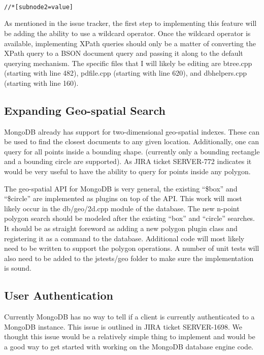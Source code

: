 \documentclass{dependencies/acm_proc_article-sp}
\begin{document}
\begin{center}
\begin{lstlisting}

//*[subnode2=value]
\end{lstlisting}
\end{center}
As mentioned in the issue tracker, the first step to implementing this feature will be adding the ability to use a wildcard operator. Once the wildcard operator is available, implementing XPath queries should only be a matter of converting the XPath query to a BSON document query and passing it along to the default querying mechanism. The specific files that I will likely be editing are btree.cpp (starting with line 482), pdfile.cpp (starting with line 620), and dbhelpers.cpp (starting with line 160).

\subsection{Expanding Geo-spatial Search}
MongoDB already has support for two-dimensional geo-spatial indexes.
These can be used to find the closest documents to any given location.
Additionally, one can query for all points inside a bounding shape. (currently
only a bounding rectangle and a bounding circle are supported). As JIRA ticket
SERVER-772\cite{18} indicates it would be very useful to have the ability to
query for points inside any polygon.

The geo-spatial API for MongoDB is very general, the existing ``\$box'' and ``\$circle''
are implemented as plugins on top of the API.
This work will most likely occur in the db/geo/2d.cpp module of the database. The new n-point polygon
search should be modeled after the existing ``box'' and ``circle'' searches. It should be as straight foreword
as adding a new polygon plugin class and registering it as a command to the database. Additional code will most
likely need to be written to support the polygon operations.
A number of unit tests will also need to be added to the jstests/geo folder to make sure the implementation is sound.

\subsection{User Authentication}
Currently MongoDB has no way to tell if a client is currently authenticated
to a MongoDB instance. This issue is outlined in JIRA ticket SERVER-1698\cite{19}.
We thought this issue would be a relatively simple thing to implement and would be
a good way to get started with working on the MongoDB database engine code.
\end{document}
